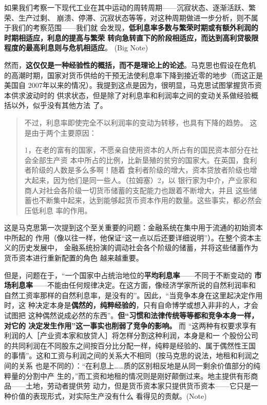 如果我们考察一下现代工业在其中运动的周转周期——沉寂状态、逐渐活跃、繁荣、生产过剩、
崩溃、停滞、沉寂状态等等，对这种周期做进一步分析，则不属于我们的考察范围——我们就
会发现，\textbf{低利息率多数与繁荣时期或有额外利润的时期相适应，利息的提高与繁荣
转向急转直下的阶段相适应，而达到高利贷极限程度的最高利息则与危机相适应}。
 (Big Note)

然而，\textbf{这仅仅是一种经验性的概括，而不是理论上的论述}。马克思也假设在危机
的高潮时期，国家对货币供给的干预无法使利息率下降到接近零的地步（而这正是美国自
2007年以来的情况）。我提到这点是因为，很明显，马克思试图掌握货币资本供求波动时的
供求状态，但是除了对利息率和利润率之间的变动关系做经验概括以外，似乎没有其他方法
了。

\begin{quotation}不过，利息率即使完全不以利润率的变动为转移，也具有下降的趋势。
这是由于两个主要原因：

  1，在老的富有的国家，不愿亲自使用资本的人所占有的国民资本部分在社会全部生产资
本中所占的比例，比新垦殖的贫穷的国家大。在英国，食利者阶级的人数是多么多啊！随着
食利者阶级的增大，资本贷放者阶级也增大起来，因为他们是同一些人。（拉姆塞）2，以
银行家为中介，产业家和商人对社会各阶级一切货币储蓄的支配能力也跟着不断增大，并且
这些储蓄也不断集中起来，达到能够起货币资本作用的数量。这些事实，都必然会压低利息
率的作用。
\end{quotation}

这是马克思第一次提到这个至关重要的问题：金融系统在集中用于流通的初始资本中所起的
作用（像以往一样，他保证“这一点以后还要详细说明”）。在整个资本主义的历史发展中，
金融系统扮演的调动社会各个阶级的储蓄，并将这些储蓄作为货币资本进行重新配置的角色
越来越重要。

但是，问题在于，“一个国家中占统治地位的\textbf{平均利息率}——不同于不断变动的
\textbf{市场利息率}——不能由任何规律决定。在这方面，像经济学家所说的自然利润率和
自然工资率那样的自然利息率，是没有的”。因此，“当竞争本身在这里起决定作用时，这
种决定本身是\textbf{偶然的，纯粹经验的}，只有自命博学或想入非非的人，才会试图把
这种偶然说成必然的东西”。\textbf{但“习惯和法律传统等等都和竞争本身一样，对它的
决定发生作用”这一事实也削弱了竞争的影响。} 而
“这两种有权要求享有利润的人［产业资本家和放贷人］将怎样分割这种利润，本身是和一
个股份公司的共同利润在不同股东之间按百分比分配一样，纯粹是经验的、属于偶然性王国
的事情”。这和工资与利润之间的关系大不相同（按马克思的说法，地租和利润之间的关系
也是不同的）：“在利息上……质的区别相反地是从同一剩余价值部分的纯粹量的分割中产
生的，”而工资和地租的情况则是刚好颠倒过来。地主提供有形商品——土地，劳动者提供劳
动力，但是货币资本家只提供货币资本——它只是一种价值的表现形式，对实际生产没有什么
看得见的贡献。(Note)

